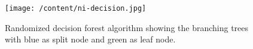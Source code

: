 \begin{figure}
	[h] \centering 
	\texttt{[image: /content/ni-decision.jpg]} \caption{Randomized decision forest algorithm showing the branching trees with blue as split node and green as leaf node. \cite{13}} \label{fg:ni:decision} 
\end{figure}
